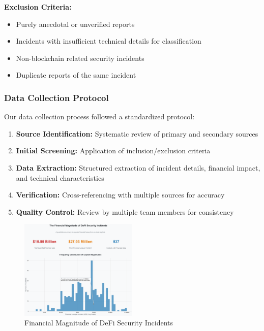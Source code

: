 \textbf{Exclusion Criteria:}
\begin{itemize}
    \item Purely anecdotal or unverified reports
    \item Incidents with insufficient technical details for classification
    \item Non-blockchain related security incidents
    \item Duplicate reports of the same incident
\end{itemize}

\subsubsection{Data Collection Protocol}
Our data collection process followed a standardized protocol:
\begin{enumerate}
    \item \textbf{Source Identification:} Systematic review of primary and secondary sources
    \item \textbf{Initial Screening:} Application of inclusion/exclusion criteria
    \item \textbf{Data Extraction:} Structured extraction of incident details, financial impact, and technical characteristics
    \item \textbf{Verification:} Cross-referencing with multiple sources for accuracy
    \item \textbf{Quality Control:} Review by multiple team members for consistency
\end{enumerate}


\begin{figure}[H]
\centering
\includegraphics[width=0.5\textwidth]{../figure/methodology/fig4.png}
\caption{Financial Magnitude of DeFi Security Incidents}
\label{fig:data_pipeline}
\end{figure}
